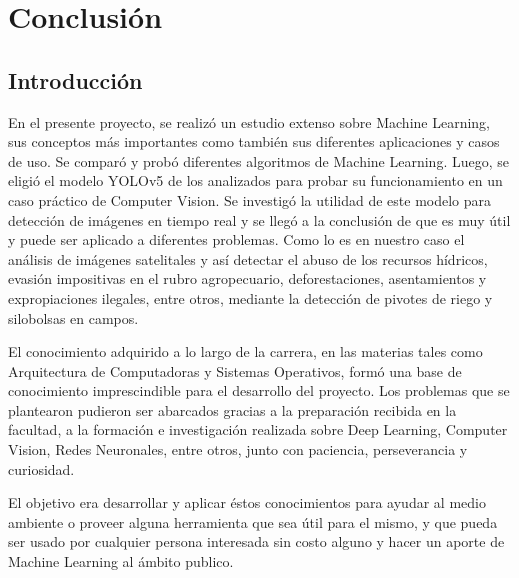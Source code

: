 \chapter{Conclusión}
\label{Conclusión}
\section{Introducción}

En el presente proyecto, se realizó un estudio extenso sobre Machine Learning, sus conceptos más importantes como también sus diferentes aplicaciones y casos de uso. Se comparó y probó diferentes algoritmos de Machine Learning. Luego, se eligió el modelo YOLOv5 de los analizados para probar su funcionamiento en un caso práctico de Computer Vision. Se investigó la utilidad de este modelo para detección de imágenes en tiempo real y se llegó a la conclusión de que es muy útil y puede ser aplicado a diferentes problemas. Como lo es en nuestro caso el análisis de imágenes satelitales y así detectar el abuso de los recursos hídricos, evasión impositivas en el rubro agropecuario, deforestaciones, asentamientos y expropiaciones ilegales, entre otros, mediante la detección de pivotes de riego y silobolsas en campos.

El conocimiento adquirido a lo largo de la carrera, en las materias tales como Arquitectura de Computadoras y Sistemas Operativos, formó una base de conocimiento imprescindible para el desarrollo del proyecto. Los problemas que se plantearon pudieron ser abarcados gracias a la preparación recibida en la facultad, a la formación e investigación realizada sobre Deep Learning, Computer Vision, Redes Neuronales, entre otros, junto con paciencia, perseverancia y curiosidad.

El objetivo era desarrollar y aplicar éstos conocimientos para ayudar al medio ambiente o proveer alguna herramienta que sea útil para el mismo, y que pueda ser usado por cualquier persona interesada sin costo alguno y hacer un aporte de Machine Learning al ámbito publico. 

